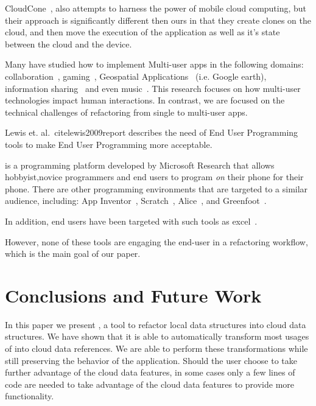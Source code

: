 \documentclass{sigplanconf}
\begin{document}

CloudCone~\cite{chun2011clonecloud}, also attempts to harness the power of mobile cloud computing, but their approach is significantly different then ours in that they create clones on the cloud, and then move the execution of the application as well as it's state between the cloud and the device.

Many have studied how to implement Multi-user apps in the following domains: collaboration~\cite{Yuill:multiuserColab, Lopez-Gulliver:imageprocessing}, gaming~\cite{Leichtenstern:multiuserGames}, Geospatial Applications~\cite{Forlines:geospatial} (i.e. Google earth), information sharing~\cite{Nacenta:2012:LMM:2307798.2307816} and even music~\cite{Sorensen:2012:ISM:2399016.2399094}. This research focuses on how multi-user technologies impact human interactions. In contrast, we are focused on the technical challenges of refactoring from single to multi-user apps.



Lewis et. al.~cite{lewis2009report} describes the need of End User Programming tools to make End User Programming more acceptable.  

\TD is a programming platform developed by Microsoft Research that allows hobbyist,novice programmers and end users  to program \emph{on} their phone for their phone.  There are other programming environments that are targeted to a similar audience, including:  App Inventor~\cite{Wolber}, Scratch~\cite{maloney2010scratch}, Alice~\cite{cooper2010design}, and Greenfoot~\cite{kolling2010greenfoot}.  

In addition, end users have been targeted with such tools as excel~\cite{badame2012refactoring}.

However, none of these tools are engaging the end-user in a refactoring workflow, which is the main goal of our paper.




\section{Conclusions and Future Work}
\label{sec:conclusions}
In this paper we present \tool, a tool to refactor local data structures into cloud data structures.  We have shown that it is able to automatically transform most usages of \NC{} into cloud data references.  We are able to perform these transformations while still preserving the behavior of the application.  Should the user choose to take further advantage of the cloud data features, in some cases only a few lines of code are needed to take advantage of the cloud data features to provide more functionality. 
\end{document}
